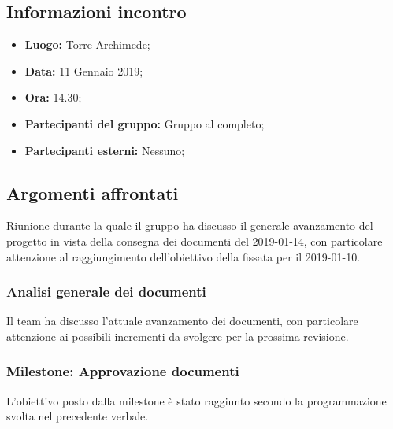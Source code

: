 \subsection{Informazioni incontro}
\begin{itemize}
	\item { \textbf{Luogo:} Torre Archimede;  }
	\item { \textbf{Data:} 11 Gennaio 2019; }
	\item { \textbf{Ora:} 14.30; }
	\item { \textbf{Partecipanti del gruppo:} Gruppo al completo;}
	\item { \textbf{Partecipanti esterni:} Nessuno; }
\end{itemize}


\subsection{Argomenti affrontati}
Riunione durante la quale il gruppo ha discusso il generale avanzamento del progetto in vista della consegna dei documenti del 2019-01-14, con particolare attenzione al raggiungimento dell'obiettivo della  fissata per il 2019-01-10.

\subsubsection{Analisi generale dei documenti}
Il team ha discusso l'attuale avanzamento dei documenti, con particolare attenzione ai possibili incrementi da svolgere per la prossima revisione.
\subsubsection{Milestone: Approvazione documenti}
L'obiettivo posto dalla milestone è stato raggiunto secondo la programmazione svolta nel precedente verbale.